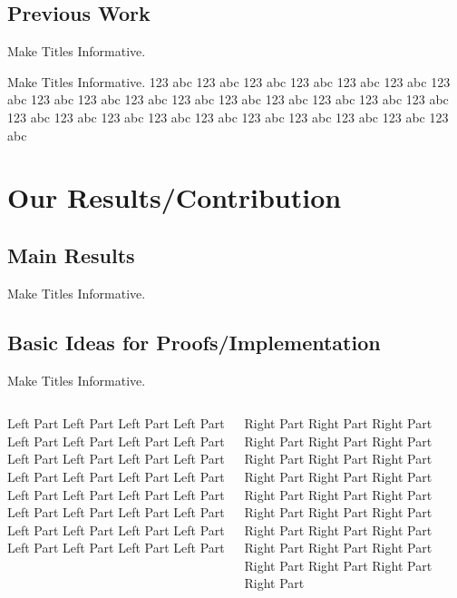 \documentclass{beamer}
\begin{document}
\subsection{Previous Work}

\begin{frame}{Make Titles Informative.}
\end{frame}

\begin{frame}{Make Titles Informative.}
 123 abc 123 abc  123 abc  123 abc  123 abc  123 abc  123 abc  123 abc  123 abc  123 abc  123 abc 
  123 abc  123 abc  123 abc  123 abc  123 abc  123 abc  123 abc  123 abc  123 abc  123 abc 
   123 abc  123 abc  123 abc  123 abc  123 abc  
\end{frame}


\section{Our Results/Contribution}

\subsection{Main Results}

\begin{frame}{Make Titles Informative.}
\end{frame}

\subsection{Basic Ideas for Proofs/Implementation}

\begin{frame}{Make Titles Informative.}
  \begin{columns}[T]
    \begin{column}{.48\textwidth}
      Left Part Left Part Left Part Left Part Left Part Left Part Left Part Left Part
      Left Part Left Part Left Part Left Part Left Part Left Part Left Part Left Part
      Left Part Left Part Left Part Left Part Left Part Left Part Left Part Left Part
      Left Part Left Part Left Part Left Part Left Part Left Part Left Part Left Part
    \end{column}
    \hfill
    \begin{column}{.48\textwidth}
      Right Part Right Part Right Part Right Part Right Part Right Part Right Part
      Right Part Right Part Right Part Right Part Right Part Right Part Right Part
      Right Part Right Part Right Part Right Part Right Part Right Part Right Part
      Right Part Right Part Right Part Right Part Right Part Right Part Right Part
    \end{column}
  \end{columns}
\end{frame}
\end{document}
